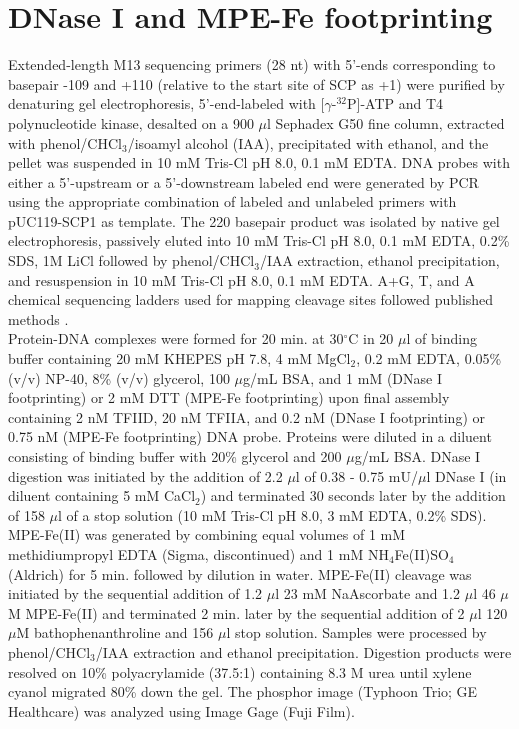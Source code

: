 \section{DNase I and MPE-Fe footprinting}

Extended-length M13 sequencing primers (28 nt) with 5'-ends corresponding to basepair -109 and +110 (relative to the start site of SCP as +1) were purified by denaturing gel electrophoresis, 5'-end-labeled with [$\gamma$-$^{32}$P]-ATP and T4 polynucleotide kinase, desalted on a 900 $\mu$l Sephadex G50 fine column, extracted with phenol/CHCl$_{3}$/isoamyl alcohol (IAA), precipitated with ethanol, and the pellet was suspended in 10 mM Tris-Cl pH 8.0, 0.1 mM EDTA. DNA probes with either a 5'-upstream or a 5'-downstream labeled end were generated by PCR using the appropriate combination of labeled and unlabeled primers with pUC119-SCP1 \cite{Juven-Gershon_1249} as template.  The 220 basepair product was isolated by native gel electrophoresis, passively eluted into 10 mM Tris-Cl pH 8.0, 0.1 mM EDTA, 0.2\% SDS, 1M LiCl  followed by phenol/CHCl$_{3}$/IAA extraction, ethanol precipitation, and resuspension in 10 mM Tris-Cl pH 8.0, 0.1 mM EDTA. A+G, T, and A chemical sequencing ladders used for mapping cleavage sites followed published methods \cite{Iverson_3815,Sambrook_3729}.\\
\indent Protein-DNA complexes were formed for 20 min. at 30$^{\circ}$C in 20 $\mu$l of binding buffer containing 20 mM KHEPES pH 7.8, 4 mM MgCl$_{2}$, 0.2 mM EDTA, 0.05\% (v/v) NP-40, 8\% (v/v) glycerol, 100 $\mu$g/mL BSA, and 1 mM (DNase I footprinting) or 2 mM DTT (MPE-Fe footprinting) upon final assembly containing 2 nM TFIID, 20 nM TFIIA, and 0.2 nM (DNase I footprinting) or 0.75 nM (MPE-Fe footprinting) DNA probe.  Proteins were diluted in a diluent consisting of binding buffer with 20\% glycerol and 200 $\mu$g/mL BSA.  DNase I digestion was initiated by the addition of 2.2 $\mu$l of 0.38 - 0.75 mU/$\mu$l DNase I (in diluent containing 5 mM CaCl$_{2}$) and terminated 30 seconds later by the addition of 158 $\mu$l of a stop solution (10 mM Tris-Cl pH 8.0, 3 mM EDTA, 0.2\% SDS).  MPE-Fe(II) was generated by combining equal volumes of 1 mM methidiumpropyl EDTA (Sigma, discontinued) and 1 mM NH$_{4}$Fe(II)SO$_{4}$ (Aldrich) for 5 min. followed by dilution in water.  MPE-Fe(II) cleavage was initiated by the sequential addition of 1.2 $\mu$l 23 mM NaAscorbate and 1.2 $\mu$l 46 $\mu$M MPE-Fe(II) and terminated 2 min. later by the sequential addition of 2 $\mu$l 120 $\mu$M bathophenanthroline and 156 $\mu$l stop solution.  Samples were processed by phenol/CHCl$_{3}$/IAA extraction and ethanol precipitation.  Digestion products were resolved on 10\% polyacrylamide (37.5:1) containing 8.3 M urea until xylene cyanol migrated 80\% down the gel.  The phosphor image (Typhoon Trio; GE Healthcare) was analyzed using Image Gage (Fuji Film). 


